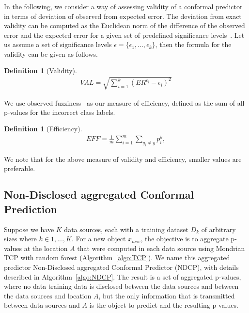\documentclass[preprint,12pt,authoryear]{elsarticle}
\newtheorem{definition}[theorem1]{Definition}
\begin{document}
In the following, we consider a way of assessing validity of a conformal predictor in terms of deviation of observed from expected error. The deviation from exact validity can be computed as the Euclidean norm of the difference of the observed error and the expected error for a given set of predefined significance levels~\citep{carlsson2017comparing}. Let us assume a set of significance levels $\epsilon = \{ \epsilon_1, ..., \epsilon_k \}$, then the formula for the validity can be given as follows.

\begin{definition}[Validity]
\begin{align} \label{eq:validity}
		VAL = \sqrt{ \sum\limits_{i=1}^{k} (ER^{\epsilon_i} -\epsilon_i)^2 }
\end{align}	 
\end{definition}


We use observed fuzziness~\citep{vovk2016criteria} as our measure of efficiency,  defined as the sum of all p-values for the incorrect class labels. %
\begin{definition}[Efficiency]
\begin{align} \label{eq:efficiency}
	EFF =\frac{ 1}{m} \sum\limits_{i=1}^{m} \sum\limits_{y_i \neq y }  p_i^y,		
\end{align}
\end{definition}
We note that for the above measure of validity and efficiency, smaller
values are preferable.

\subsection{Non-Disclosed aggregated Conformal Prediction}
%
Suppose we have $K$ data sources, each with a training dataset $D_k$ of arbitrary sizes where $k \in {1,...,K}$. For a new object $x_{new}$, the objective is to aggregate p-values at the location $A$ that were computed in each data source using Mondrian TCP with random forest (Algorithm~\ref{algo:TCP}). We name this aggregated predictor Non-Disclosed aggregated Conformal Predictor (NDCP), with details described in Algorithm~\ref{algo:NDCP}. The result is a set of aggregated p-values, where no data training data is disclosed between the data sources and between the data sources and location $A$, but the only information that is transmitted between data sources and $A$ is the object to predict and the resulting p-values.
\end{document}
